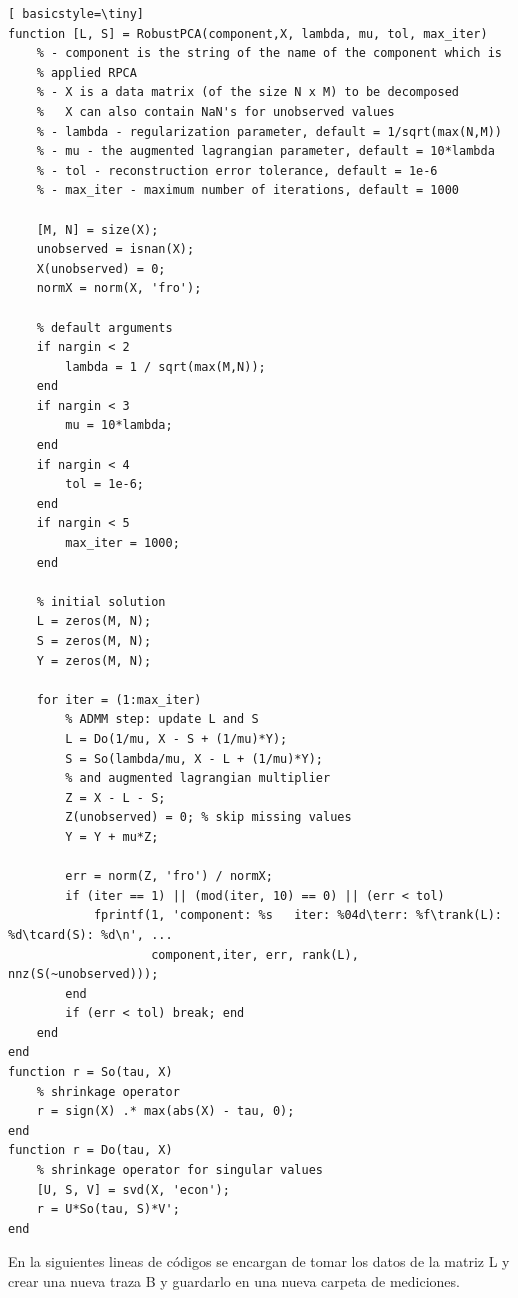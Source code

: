 \begin{lstlisting}[ basicstyle=\tiny]
function [L, S] = RobustPCA(component,X, lambda, mu, tol, max_iter)
    % - component is the string of the name of the component which is
    % applied RPCA
    % - X is a data matrix (of the size N x M) to be decomposed
    %   X can also contain NaN's for unobserved values
    % - lambda - regularization parameter, default = 1/sqrt(max(N,M))
    % - mu - the augmented lagrangian parameter, default = 10*lambda
    % - tol - reconstruction error tolerance, default = 1e-6
    % - max_iter - maximum number of iterations, default = 1000

    [M, N] = size(X);
    unobserved = isnan(X);
    X(unobserved) = 0;
    normX = norm(X, 'fro');

    % default arguments
    if nargin < 2
        lambda = 1 / sqrt(max(M,N));
    end
    if nargin < 3
        mu = 10*lambda;
    end
    if nargin < 4
        tol = 1e-6;
    end
    if nargin < 5
        max_iter = 1000;
    end
    
    % initial solution
    L = zeros(M, N);
    S = zeros(M, N);
    Y = zeros(M, N);
    
    for iter = (1:max_iter)
        % ADMM step: update L and S
        L = Do(1/mu, X - S + (1/mu)*Y);
        S = So(lambda/mu, X - L + (1/mu)*Y);
        % and augmented lagrangian multiplier
        Z = X - L - S;
        Z(unobserved) = 0; % skip missing values
        Y = Y + mu*Z;
        
        err = norm(Z, 'fro') / normX;
        if (iter == 1) || (mod(iter, 10) == 0) || (err < tol)
            fprintf(1, 'component: %s   iter: %04d\terr: %f\trank(L): %d\tcard(S): %d\n', ...
                    component,iter, err, rank(L), nnz(S(~unobserved)));
        end
        if (err < tol) break; end
    end
end
function r = So(tau, X)
    % shrinkage operator
    r = sign(X) .* max(abs(X) - tau, 0);
end
function r = Do(tau, X)
    % shrinkage operator for singular values
    [U, S, V] = svd(X, 'econ');
    r = U*So(tau, S)*V';
end
\end{lstlisting}

En la siguientes lineas de códigos se encargan de tomar los datos de la matriz L y crear una nueva traza B y guardarlo en una nueva carpeta de mediciones.

